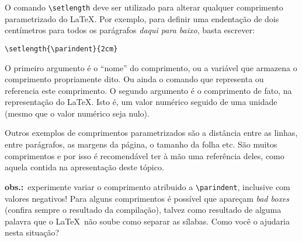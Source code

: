 \documentclass[a4paper,12pt]{article}
\newcommand{\foreign}[1]{\textsl{#1}}
\newcommand{\obs}{\textbf{obs.:}}
\begin{document}
	
	O comando \verb|\setlength| deve ser utilizado para alterar qualquer comprimento parametrizado do \LaTeX. Por exemplo, para definir uma endentação de dois centímetros para todos os parágrafos \emph{daqui para baixo}, basta escrever:
		
	\setlength{\parindent}{2cm}
	\verb|\setlength{\parindent}{2cm}|
	
	O primeiro argumento é o ``nome'' do comprimento, ou a variável que armazena o comprimento propriamente dito. Ou ainda o comando que representa ou referencia este comprimento. O segundo argumento é o comprimento de fato, na representação do \LaTeX. Isto é, um valor numérico seguido de uma unidade (mesmo que o valor numérico seja nulo).
	
	Outros exemplos de comprimentos parametrizados são a distância entre as linhas, entre parágrafos, as margens da página, o tamanho da folha etc. São muitos comprimentos e por isso é recomendável ter à mão uma referência deles, como aquela contida na apresentação deste tópico.

	\obs\ experimente variar o comprimento atribuido a \verb|\parindent|, inclusive com valores negativos! Para alguns comprimentos é possível que apareçam \foreign{bad boxes} (confira sempre o resultado da compilação), talvez como resultado de alguma palavra que o \LaTeX\ não soube como separar as sílabas. Como você o ajudaria nesta situação?
\end{document}
